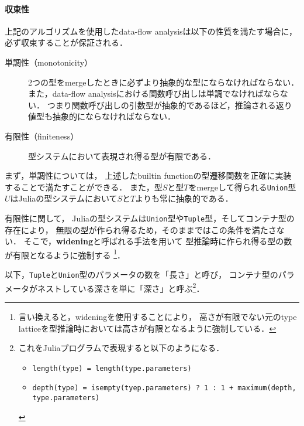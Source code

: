 \paragraph{収束性} \label{paragraph:inference-convergence}

上記のアルゴリズムを使用したdata-flow analysisは以下の性質を満たす場合に，
必ず収束することが保証される\cite{graph-free-data-flow-analysis, jameson}．

\begin{description}
  \item [単調性（monotonicity）]
        2つの型をmergeしたときに必ずより抽象的な型にならなければならない．
        また，data-flow analysisにおける関数呼び出しは単調でなければならない．
        つまり関数呼び出しの引数型が抽象的であるほど，推論される返り値型も抽象的にならなければならない．
  \item [有限性（finiteness）] 型システムにおいて表現され得る型が有限である．
\end{description}

まず，単調性については，
上述したbuiltin functionの型遷移関数を正確に実装することで満たすことができる．
また，型\(S\)と型\(T\)をmergeして得られる\verb|Union|型\(U\)\footnotemark はJuliaの型システムにおいて\(S\)と\(T\)よりも常に抽象的である．


有限性に関して，
Juliaの型システムは\verb|Union|型や\verb|Tuple|型，そしてコンテナ型の存在により，
無限の型が作られ得るため，そのままではこの条件を満たさない．
そこで，\textbf{widening}と呼ばれる手法を用いて
型推論時に作られ得る型の数が有限となるように強制する
\footnote{
  言い換えると，wideningを使用することにより，
  高さが有限でない元のtype latticeを型推論時においては高さが有限となるように強制している．
}．

以下，\verb|Tuple|と\verb|Union|型のパラメータの数を「長さ」と呼び，
コンテナ型のパラメータがネストしている深さを単に「深さ」と呼ぶ\footnote{
  これをJuliaプログラムで表現すると以下のようになる．
  \begin{itemize}
    \item \texttt{length(type) = length(type.parameters)}
    \item \texttt{depth(type) = isempty(tyep.parameters) ? 1 : 1 + maximum(depth, type.parameters)}
  \end{itemize}
}．


